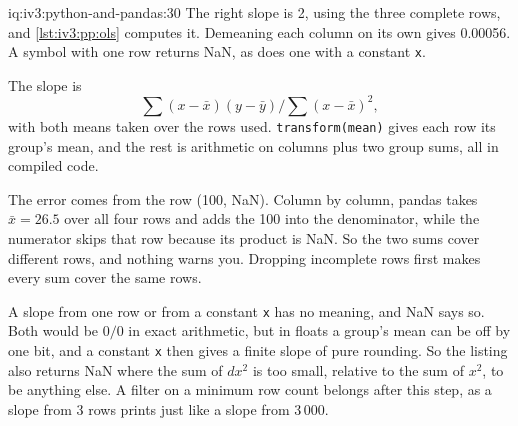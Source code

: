 \begin{solution}{iq:iv3:python-and-pandas:30}
The right slope is 2, using the three complete rows, and \cref{lst:iv3:pp:ols} computes it. Demeaning each column on its own gives 0.00056. A symbol with one row returns NaN, as does one with a constant \texttt{x}.
\label{lst:iv3:pp:ols}

The slope is
\[ \sum (x - \bar x)(y - \bar y) \Big/ \sum (x - \bar x)^2, \]
with both means taken over the rows used. \texttt{transform(\textquotesingle mean\textquotesingle)} gives each row its group's mean, and the rest is arithmetic on columns plus two group sums, all in compiled code.

The error comes from the row (100, NaN). Column by column, pandas takes $\bar x = 26.5$ over all four rows and adds the 100 into the denominator, while the numerator skips that row because its product is NaN. So the two sums cover different rows, and nothing warns you. Dropping incomplete rows first makes every sum cover the same rows.

A slope from one row or from a constant \texttt{x} has no meaning, and NaN says so. Both would be $0 / 0$ in exact arithmetic, but in floats a group's mean can be off by one bit, and a constant \texttt{x} then gives a finite slope of pure rounding. So the listing also returns NaN where the sum of $dx^2$ is too small, relative to the sum of $x^2$, to be anything else. A filter on a minimum row count belongs after this step, as a slope from 3 rows prints just like a slope from 3\,000.

\end{solution}

